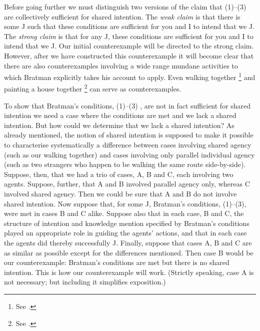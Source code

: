 \documentclass[12pt,\papersize]{extarticle}
\begin{document}
Before going further we must distinguish two versions of the claim that (1)--(3) are collectively sufficient for shared intention.
The \emph{weak claim} is that there is some J such that these conditions are sufficient for you and I to intend that we J.
The \emph{strong claim\label{strong_claim}} is that for any J, these conditions are sufficient for you and I to intend that we J. 
Our initial counterexample will be directed to the strong claim.
However, after we have constructed this counterexample it will become clear that there are also counterexamples involving a wide range mundane activities to which Bratman explicitly takes his account to apply.
Even walking together%
	\footnote{
	See \citet[p.\ 150]{Bratman:2009lv}.
	}
and painting a house together%
	\footnote{
	See \citet[p.\ 331]{Bratman:1992mi}.
	}
can serve as counterexamples.
 



To show that  Bratman's conditions, (1)--(3) , are not in fact sufficient for shared intention we need 
a case where the conditions are met and we lack a shared intention.
But how could we determine that we lack a shared intention?
As already mentioned, the notion of shared intention is supposed to 
	make it possible to 
	characterise systematically a difference between 
		cases involving shared agency (such as our walking together)
		and
		cases involving only parallel  individual agency (such as two strangers who happen to be walking the same route side-by-side). 
Suppose, then, that we had a trio of cases, A, B and C, each involving two agents.
Suppose, further, that A and B involved parallel agency only, whereas C involved shared agency.
Then we could be sure that A and B do not involve shared intention.
Now suppose 
	that, for some J, Bratman's conditions, (1)--(3), were met in cases B and C alike.
Suppose also that in each case, B and C, the structure of intention and knowledge mention specified by Bratman's conditions 
 played an appropriate role in guiding the agents' actions,
	and that in each case the agents did thereby  successfully J.
Finally, suppose that cases A, B and C are as similar as possible except for the differences mentioned.
Then case B would be our counterexample:
Bratman's conditions are met but there is no shared intention.
This is how our counterexample will work.
(Strictly speaking, case A is not necessary; but including it simplifies exposition.)
\end{document}
